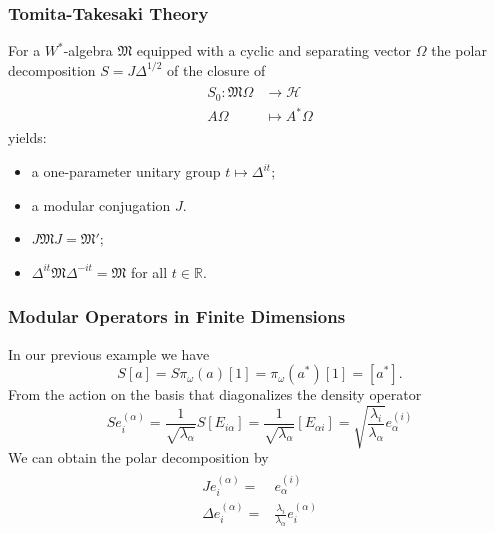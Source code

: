 \documentclass{beamer}
\begin{document}
\begin{frame}
	\frametitle{Tomita-Takesaki Theory}
	For a $W^*$-algebra $\mathfrak{M}$ equipped with a cyclic and separating vector $\Omega$ the polar decomposition $S=J\Delta^{1/2}$ of the closure of
	\begin{align}
	\begin{split}
		S_0:\mathfrak{M}\Omega&\rightarrow\mathcal{H}\\
		A\Omega&\mapsto A^*\Omega
	\end{split}
	\end{align}
	yields:
	\begin{itemize}
		\item a one-parameter unitary group $t\mapsto\Delta^{it}$;
		\item a modular conjugation $J$.
	\end{itemize}
	\begin{theorem}
		\begin{itemize}
			\item $J\mathfrak{M}J=\mathfrak{M}'$;
			\item $\Delta^{it}\mathfrak{M}\Delta^{-it}=\mathfrak{M}$ for all $t\in\mathbb{R}$. 	
		\end{itemize}
	\end{theorem}
\end{frame}

\begin{frame}

	\frametitle{Modular Operators in Finite Dimensions}
	
	\begin{Example}
		In our previous example we have
		\begin{equation}
			S[a]=S\pi_\omega(a)[1]=\pi_\omega(a^*)[1]=[a^*].
		\end{equation}
From the action on the basis that diagonalizes the density operator
		\begin{equation}
			Se_i^{(\alpha)}=\frac{1}{\sqrt{\lambda_\alpha}}S[E_{i\alpha}]=\frac{1}{\sqrt{\lambda_\alpha}}[E_{\alpha i}]=\sqrt{\frac{\lambda_i}{\lambda_\alpha}}e_\alpha^{(i)}
		\end{equation}
We can obtain the polar decomposition by
		\begin{align}
		\begin{split}
			Je_i^{(\alpha)}=&e_\alpha^{(i)}\\
			\Delta e_i^{(\alpha)}=&\frac{\lambda_i}{\lambda_\alpha}e_i^{(\alpha)}
		\end{split}
		\end{align}
	\end{Example}

\end{frame}
\end{document}
